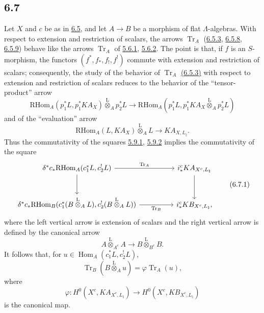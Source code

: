 \documentclass[11pt]{article}
\DeclareMathOperator{\Hom}{Hom}
\providecommand{\RHom}{\mathrm{RHom}}
\providecommand{\Tr}{\operatorname{Tr}}
\providecommand{\Tr}{\operatorname{Tr}}
\providecommand{\lten}{\overset{\mathrm L}{\otimes}}
\providecommand{\Tr}{\operatorname{Tr}}
\providecommand{\RHom}{\mathrm{RHom}}
\providecommand{\Hom}{\operatorname{Hom}}
\providecommand{\lten}{\overset{\mathrm L}{\otimes}}
\providecommand{\RHom}{\mathrm R\mathcal{H}om}
\providecommand{\lten}{\overset{\mathrm L}{\otimes}}
\providecommand{\Tr}{\operatorname{Tr}}
\providecommand{\lten}{\overset{\mathrm L}{\otimes}}
\providecommand{\lten}{\overset{\mathrm L}{\otimes}}
\providecommand{\lten}{\overset{\mathrm L}{\otimes}}
\providecommand{\RHom}{\mathrm{RHom}}
\providecommand{\Hom}{\operatorname{Hom}}
\providecommand{\Tr}{\operatorname{Tr}}
\providecommand{\lten}{\overset{\mathrm L}{\otimes}}
\begin{document}
\subsection*{6.7}\label{sga5:IIIB:subsection:6.7}
Let $X$ and $c$ be as in \hyperref[sga5:IIIB:subsection:6.5]{6.5}, and let $A\to B$ be a morphism of flat $\Lambda$-algebras. With respect to extension and restriction of scalars, the arrows $\Tr_A$ (\hyperref[sga5:IIIB:equation:6.5.3]{6.5.3}, \hyperref[sga5:IIIB:equation:6.5.8]{6.5.8}, \hyperref[sga5:IIIB:equation:6.5.9]{6.5.9}) behave like the arrows $\Tr_A$ of \hyperref[sga5:IIIB:equation:5.6.1]{5.6.1}, \hyperref[sga5:IIIB:equation:5.6.2]{5.6.2}. The point is that, if $f$ is an $S$-morphism, the functors $(f^*,f_*,f_!,f^!)$ commute with extension and restriction of scalars; consequently, the study of the behavior of $\Tr_A$ \hyperref[sga5:IIIB:equation:6.5.3]{(6.5.3)} with respect to extension and restriction of scalars reduces to the behavior of the “tensor-product” arrow
\[
\RHom_A(p_1^*L,p_1^*KA_X)\lten_Ap_2^*L
\longrightarrow
\RHom_A(p_1^*L,p_1^*KA_X\lten_Ap_2^*L)
\]
and of the “evaluation” arrow
\[
\RHom_A(L,KA_X)\lten_A L\longrightarrow KA_{X,L_{\natural}}.
\]
Thus the commutativity of the squares \hyperref[sga5:IIIB:equation:5.9.1]{5.9.1}, \hyperref[sga5:IIIB:equation:5.9.2]{5.9.2} implies the commutativity of the square
\begin{equation}
\begin{tikzcd}[column sep=huge,row sep=large]
\delta^*c_*\RHom_A(c_1^*L,c_2^!L) \arrow[r,"\Tr_A"] \arrow[d]
& i_*^cKA_{X^c,L_{\natural}} \arrow[d]\\
\delta^*c_*\RHom_B(c_1^*(B\lten_A L),c_2^!(B\lten_A L)) \arrow[r,"\Tr_B"']
& i_*^cKB_{X^c,L_{\natural}},
\end{tikzcd}
\tag{6.7.1}\label{sga5:IIIB:equation:6.7.1}
\end{equation}
where the left vertical arrow is extension of scalars and the right vertical arrow is defined by the canonical arrow
\[
A\lten_{A^e}A\longrightarrow B\lten_{B^e}B.
\]
It follows that, for $u\in\Hom_A(c_1^*L,c_2^!L)$,
\begin{equation}
\Tr_B(B\lten_Au)=\varphi\Tr_A(u),
\tag{6.7.2}\label{sga5:IIIB:equation:6.7.2}
\end{equation}
where
\[
\varphi:H^0(X^c,KA_{X^c,L_{\natural}})\longrightarrow H^0(X^c,KB_{X^c,L_{\natural}})
\]
is the canonical map.
\end{document}

